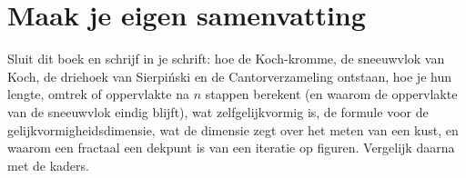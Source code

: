 
\begin{oefeningen}






\end{oefeningen}


\ifzelfstudie
\section*{Maak je eigen samenvatting}
Sluit dit boek en schrijf in je schrift: hoe de Koch-kromme, de sneeuwvlok van Koch, de driehoek van Sierpiński en de Cantorverzameling ontstaan, hoe je hun lengte, omtrek of oppervlakte na $n$ stappen berekent (en waarom de oppervlakte van de sneeuwvlok eindig blijft), wat zelfgelijkvormig is, de formule voor de gelijkvormigheidsdimensie, wat de dimensie zegt over het meten van een kust, en waarom een fractaal een dekpunt is van een iteratie op figuren. Vergelijk daarna met de kaders.
\fi

